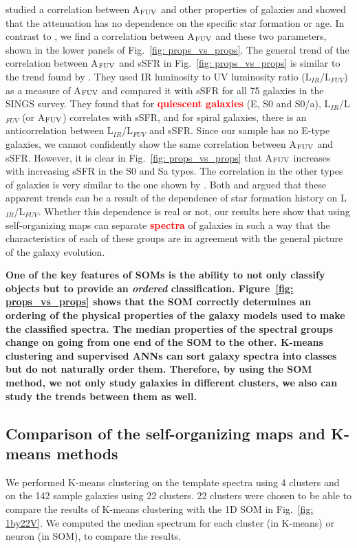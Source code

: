          studied a correlation between A$_{\rm {FUV}}$ and other properties of galaxies and showed that the attenuation has no dependence on the specific star formation or age.
        In contrast to , we find a correlation between A$_{\rm {FUV}}$ and these two parameters, shown in the lower panels of Fig.~\ref{fig: props_vs_props}.
        The general trend of the correlation between A$_{\rm {FUV}}$ and sSFR in Fig.~\ref{fig: props_vs_props} is similar to the trend found by \cite{Dale07}.
        They used IR luminosity to UV luminosity ratio (L$_{IR}$/L$_{FUV}$) as a measure of A$_{\rm {FUV}}$ and compared it with sSFR for all 75 galaxies in the SINGS survey.
        They found that for \textbf{\textcolor{red}{quiescent galaxies}} (E, S0 and S0/a), L$_{IR}$/L$_{FUV}$ (or A$_{\rm {FUV}}$) correlates with sSFR, and for spiral galaxies, there is an anticorrelation between L$_{IR}$/L$_{FUV}$ and sSFR.
        Since our sample has no E-type galaxies, we cannot confidently show the same correlation between A$_{\rm {FUV}}$ and sSFR. 
        However, it is clear in Fig.~\ref{fig: props_vs_props} that A$_{\rm {FUV}}$ increases with increasing sSFR in the S0 and Sa types.
        The correlation in the other types of galaxies is very similar to the one shown by \cite{Dale07}.
        Both \cite{Dale07} and  argued that these apparent trends can be a result of the dependence of star formation history on L$_{IR}$/L$_{FUV}$.
        Whether this dependence is real or not, our results here show that using self-organizing maps can separate \textbf{\textcolor{red}{spectra}} of galaxies in such a way that the characteristics of each of these groups are in agreement with the general picture of the galaxy evolution.
        
       \textbf{One of the key features of SOMs is the ability to not only classify objects but to provide an {\em ordered} classification. 
       Figure~\ref{fig: props_vs_props} shows that the SOM correctly determines an ordering of the physical properties of the galaxy models used to make the classified spectra. 
       The median properties of the spectral groups change on going from one end of the SOM to the other.
       K-means clustering and supervised ANNs can sort galaxy spectra into classes but do not naturally order them.
       Therefore, by using the SOM method, we not only study galaxies in different clusters, we also can study the trends between them as well.}

        
    \subsection{Comparison of the self-organizing maps and K-means methods}
    \label{sec: Kmeansvssom}
    We performed K-means clustering on the  template spectra using 4 clusters and on the  142 sample galaxies using 22 clusters.
    22 clusters were chosen to be able to compare the results of K-means clustering with the 1D SOM in Fig.~\ref{fig: 1by22V}. 
    We computed the median spectrum for each cluster (in K-means) or neuron (in SOM), to compare the results.
    
